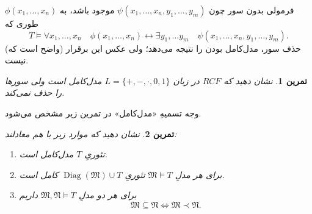 \documentclass[12pt,a4paper]{report}
\theoremstyle{colorhead}
\newtheorem{tam}{تمرین}
\DeclareMathOperator{\diag}{Diag}
\begin{document}
$\phi(x_1,\ldots,x_n)$
فرمولی 
بدون سور چون
$\psi(x_1,\ldots,x_n,y_1,\ldots,y_m)$
موجود 
باشد، به طوری که
\[
T\models \forall x_1,\ldots,x_n \quad \phi(x_1,\ldots,x_n)\leftrightarrow \exists y_1,\ldots y_m \quad \psi(x_1,\ldots,x_n,y_1,\ldots,y_m).
\]
(واضح است که)
   حذف
   سور، مدل‌کامل بودن را نتیجه می‌دهد؛ ولی عکس این برقرار نیست.
   \begin{tam}
   نشان دهید که 
   $RCF$
   در زبان
   $L=\{+,-,\cdot,0,1\}$
    مدل‌کامل است ولی سورها را حذف نمی‌کند.
   \end{tam}
وجه تسمیهِ «مدل‌کامل» در تمرین زیر مشخص می‌شود.
  \begin{tam}
  نشان دهید که موارد زیر با هم معادلند:
  \begin{enumerate}
  \item 
  تئوریِ
  $T$
  مدل‌کامل
  است.
  \item 
  برای هر مدلِ
  $\mathfrak{M}\models T$
       تئوریِ
       $\diag(\mathfrak{M})\cup T$
        کامل 
        است.
  \item 
  برای هر دو مدلِ
  $\mathfrak{M},\mathfrak{N}\models T$
  داریم
  \[
  \mathfrak{M}\subseteq \mathfrak{N}\Leftrightarrow \mathfrak{M}\prec \mathfrak{N}.
  \]
  \end{enumerate}
  \end{tam}
\pagebreak
\end{document}
